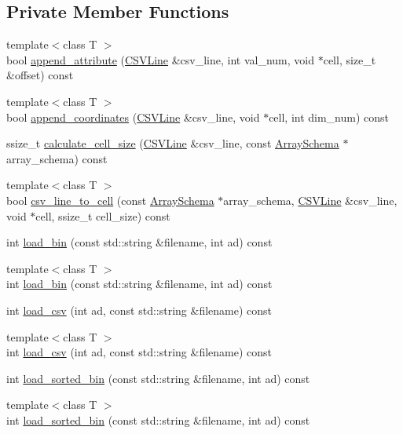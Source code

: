 \subsection*{Private Member Functions}
\begin{DoxyCompactItemize}
\item 
{\footnotesize template$<$class T $>$ }\\bool \hyperlink{classLoader_ad60ebef0b01c21972b0f11618ce38b5a}{append\+\_\+attribute} (\hyperlink{classCSVLine}{C\+S\+V\+Line} \&csv\+\_\+line, int val\+\_\+num, void $\ast$cell, size\+\_\+t \&offset) const 
\item 
{\footnotesize template$<$class T $>$ }\\bool \hyperlink{classLoader_a7f6465abb8490a0bdb6f6240e499b2d7}{append\+\_\+coordinates} (\hyperlink{classCSVLine}{C\+S\+V\+Line} \&csv\+\_\+line, void $\ast$cell, int dim\+\_\+num) const 
\item 
ssize\+\_\+t \hyperlink{classLoader_a711d2b8f7110161e1a7ca90e5024ea0a}{calculate\+\_\+cell\+\_\+size} (\hyperlink{classCSVLine}{C\+S\+V\+Line} \&csv\+\_\+line, const \hyperlink{classArraySchema}{Array\+Schema} $\ast$array\+\_\+schema) const 
\item 
{\footnotesize template$<$class T $>$ }\\bool \hyperlink{classLoader_a5e0760ac016e2c82a7a55cd3b7efcdbe}{csv\+\_\+line\+\_\+to\+\_\+cell} (const \hyperlink{classArraySchema}{Array\+Schema} $\ast$array\+\_\+schema, \hyperlink{classCSVLine}{C\+S\+V\+Line} \&csv\+\_\+line, void $\ast$cell, ssize\+\_\+t cell\+\_\+size) const 
\item 
int \hyperlink{classLoader_a46951a52895c6ca3558e62cb312c297a}{load\+\_\+bin} (const std\+::string \&filename, int ad) const 
\item 
{\footnotesize template$<$class T $>$ }\\int \hyperlink{classLoader_ac9e7c924ac3126fa976c04ffb1598379}{load\+\_\+bin} (const std\+::string \&filename, int ad) const 
\item 
int \hyperlink{classLoader_a011c4d95cbe66aaf0b103c6e9dda9b3f}{load\+\_\+csv} (int ad, const std\+::string \&filename) const 
\item 
{\footnotesize template$<$class T $>$ }\\int \hyperlink{classLoader_ae2aca5ad9d58bd8939d0ffc1bd9451d8}{load\+\_\+csv} (int ad, const std\+::string \&filename) const 
\item 
int \hyperlink{classLoader_a7c8a6bc94e113a6aeec9d5e40d4bf6c4}{load\+\_\+sorted\+\_\+bin} (const std\+::string \&filename, int ad) const 
\item 
{\footnotesize template$<$class T $>$ }\\int \hyperlink{classLoader_a80b0374ea4a019605ac8ccef9d26b238}{load\+\_\+sorted\+\_\+bin} (const std\+::string \&filename, int ad) const 
\end{DoxyCompactItemize}
